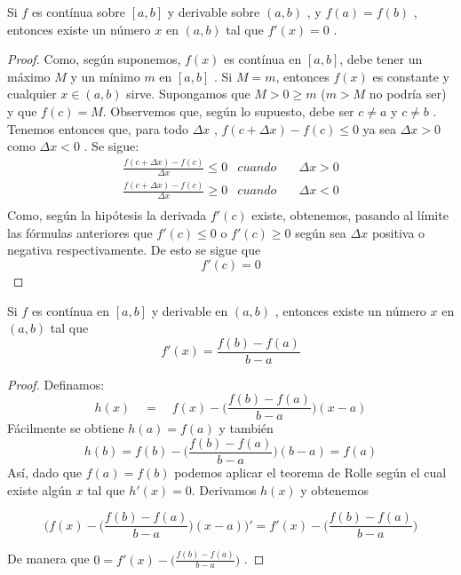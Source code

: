 \documentclass[14pt,a4paper]{extarticle}
\begin{document}
\begin{theorem} Si \( f \) es cont\'inua sobre \( [a,b] \) y derivable sobre \( (a,b) \) , y \( f(a) = f(b) \) , entonces existe un n\'umero \( x \)  en \( (a,b) \) tal que \( f'(x)=0 \) .
\end{theorem}
\begin{proof}
Como, seg\'un suponemos, \( f(x) \) es cont\'inua en \( [a,b] \), debe tener un m\'aximo \( M \) y un m\'inimo \( m \)  en \( [a,b] \) .
Si \( M = m  \), entonces \( f(x)  \) es constante y cualquier \( x \in (a,b) \) sirve.
Supongamos que \( M > 0 \geq m \)  (\(  m > M \) no podr\'ia ser) y que \( f(c)=M \). Observemos que, seg\'un lo supuesto, debe ser \( c \neq a \)  y \( c \neq b \) .
Tenemos entonces que, para todo \( \Delta x \) , \( f(c+\Delta x) - f(c) \leq 0 \) ya sea \( \Delta x > 0 \) como \( \Delta x < 0 \) . Se sigue:
{\renewcommand{\arraystretch}{1.8} %
\begin{align*}
&\frac{f(c+\Delta x)-f(c)}{\Delta x} \leq 0 & cuando  & \quad \Delta x > 0 & \\
&\frac{f(c+\Delta x)-f(c)}{\Delta x} \geq 0 & cuando & \quad \Delta x < 0 & \\
\end{align*}}
Como, seg\'un la hip\'otesis la derivada \( f'(c) \) existe, obtenemos, pasando al l\'imite las f\'ormulas anteriores que \(  f'(c) \leq 0 \)  o \(  f'(c) \geq 0 \) seg\'un sea \( \Delta x \) positiva o negativa respectivamente. De esto se sigue que
\[ f'(c)=0 \]
\end{proof}
\begin{theorem}
Si \( f \) es cont\'inua en \( [a,b] \) y derivable en \( (a,b) \) , entonces existe un n\'umero \( x \)  en \( (a,b) \) tal que
\[ f'(x)=\frac{f(b)-f(a)}{b-a} \]
\end{theorem}
\begin{proof}
Definamos:
\[ h(x) \quad = \quad f(x) - \Big(\frac{f(b)-f(a)}{b-a} \Big)(x-a) \]
F\'acilmente se obtiene \( h(a)=f(a) \) y tambi\'en
\[ h(b) = f(b) - \Big(\frac{f(b)-f(a)}{b-a}\Big)(b-a) = f(a) \]
As\'i, dado que \( f(a)=f(b) \) podemos aplicar el teorema de Rolle seg\'un el cual existe alg\'un \( x \) tal que
\( h'(x)=0 \). Derivamos \( h(x) \) y obtenemos

\[ \Bigg( f(x) - \Big(\frac{f(b)-f(a)}{b-a} \Big)(x-a) \Bigg)' = f'(x) - \Big(\frac{f(b)-f(a)}{b-a} \Big) \]

De manera que \( 0 = f'(x) - \Big(\frac{f(b)-f(a)}{b-a} \Big)  \) .
\end{proof}
\end{document}
